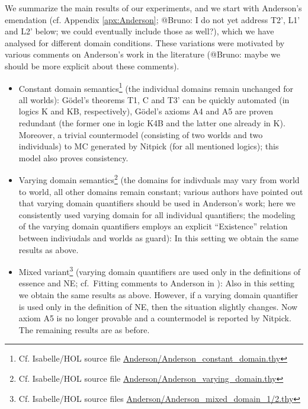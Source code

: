\documentclass{birkjour}
\theoremstyle{definition}
\theoremstyle{remark}
\numberwithin{equation}{section}
\begin{document}
We summarize the main results of our experiments, and we start with
Anderson's emendation (cf. Appendix \ref{apx:Anderson}; @Bruno: I do
not yet address T2', L1' and L2' below; we could eventually include those as well?),
which we have analysed for different domain conditions. These
variations were motivated by various comments on Anderson's work in
the literature (@Bruno: maybe we should be more explicit about these
comments).
\begin{itemize}
\item Constant domain semantics\footnote{Cf. Isabelle/HOL source file
    \url{Anderson/Anderson_constant_domain.thy}} (the individual
  domains remain unchanged for all worlds): G\"odel's theorems T1, C
  and T3' can be quickly automated (in logics K and KB, respectively),
  G\"odel's axioms A4 and A5 are proven redundant (the former one in
  logic K4B and the latter one already in K). Moreover, a trivial
  countermodel (consisting of two worlds and two individuals) to MC
  generated by Nitpick (for all mentioned logics); this model also
  proves consistency. 
\item Varying domain semantics\footnote{Cf. Isabelle/HOL source file
    \url{Anderson/Anderson_varying_domain.thy}} (the domains for
  indivduals may vary from world to world, all other domains remain
  constant; various authors have pointed out that varying domain
  quantifiers should be used in Anderson's work; here we consistently
  used varying domain for all individual quantifiers; the modeling of
  the varying domain quantifiers employs an explicit ``Existence''
  relation between indiviudals and worlds as guard): In this setting we obtain the
  same results as above.
\item Mixed variant\footnote{Cf. Isabelle/HOL source files
    \url{Anderson/Anderson_mixed_domain_1/2.thy}} (varying domain
  quantifiers are used only in the definitions of essence and NE;
  cf.~Fitting comments to Anderson in
  \cite{fitting02:_types_tableaus_god}): Also in this setting we
  obtain the same results as above. However, if a varying domain
  quantifier is used only in the definition of NE, then the
  situation slightly changes. Now axiom A5 is no longer provable and
  a countermodel is reported by Nitpick. The remaining results are as before.

\end{itemize}
 
\end{document}

